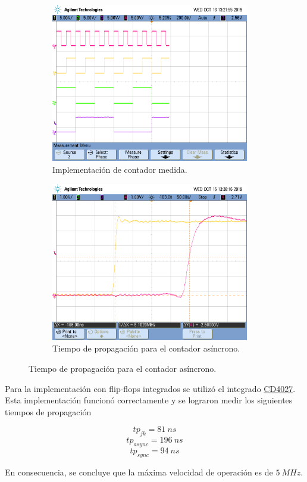 \begin{figure}[H]
\begin{subfigure}{0.49\textwidth}
	\centering
	\includegraphics[width=0.95\textwidth,trim={0 2.2cm 0.1cm 1.75cm},clip]{Imagenes/counter.png}
	\caption{Implementación de contador medida.}
	\label{counterr}
\end{subfigure}
\begin{subfigure}{0.49\textwidth}
	\centering
	\includegraphics[width=0.95\textwidth,trim={0 2.2cm 0.1cm 1.75cm},clip]{Imagenes/counter1.png}
	\caption{Tiempo de propagación para el contador asíncrono.}
	\label{countersadr}
\end{subfigure}
\end{figure}

Para la implementación con flip-flops integrados se utilizó el integrado \href{http://www.sycelectronica.com.ar/semiconductores/CD4027.pdf}{CD4027}. Esta implementación funcionó correctamente y se lograron medir los siguientes tiempos de propagación

$$tp_{jk}= 81 \ ns$$
$$tp_{async}= 196 \ ns$$
$$tp_{sync}= 94 \ ns$$

En consecuencia, se concluye que la máxima velocidad de operación es de $5 \ MHz$.